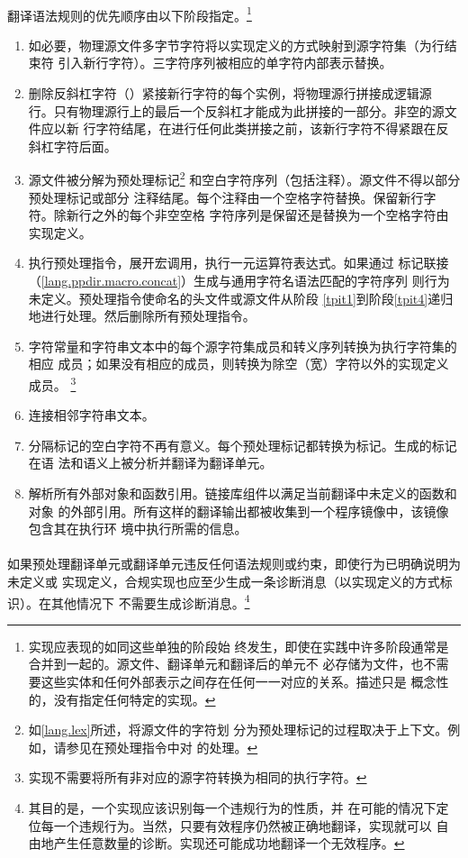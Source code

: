 \paragraph{}
翻译语法规则的优先顺序由以下阶段指定。\footnote{实现应表现的如同这些单独的阶段始
终发生，即使在实践中许多阶段通常是合并到一起的。源文件、翻译单元和翻译后的单元不
必存储为文件，也不需要这些实体和任何外部表示之间存在任何一一对应的关系。描述只是
概念性的，没有指定任何特定的实现。}
\begin{enumerate}
  \newcommand{\tpit}[1]{\item{#1\label{tpit\arabic{enumi}}}}
  \tpit{如必要，物理源文件多字节字符将以实现定义的方式映射到源字符集（为行结束符
    引入新行字符）。三字符序列被相应的单字符内部表示替换。}
  \tpit{删除反斜杠字符（\tm{\bs}）紧接新行字符的每个实例，将物理源行拼接成逻辑源
    行。只有物理源行上的最后一个反斜杠才能成为此拼接的一部分。非空的源文件应以新
    行字符结尾，在进行任何此类拼接之前，该新行字符不得紧跟在反斜杠字符后面。}
  \tpit{源文件被分解为预处理标记\footnote{如\ref{lang.lex}所述，将源文件的字符划
    分为预处理标记的过程取决于上下文。例如，请参见在\tm{\#include}预处理指令中对
    \tm{<}的处理。} 和空白字符序列（包括注释）。源文件不得以部分预处理标记或部分
    注释结尾。每个注释由一个空格字符替换。保留新行字符。除新行之外的每个非空空格
    字符序列是保留还是替换为一个空格字符由实现定义。}
  \tpit{执行预处理指令，展开宏调用，执行一元运算符表达式。如果通过
    标记联接（\ref{lang.ppdir.macro.concat}）生成与通用字符名语法匹配的字符序列
    则行为未定义。\tm{\#include}预处理指令使命名的头文件或源文件从阶段
    \ref{tpit1}到阶段\ref{tpit4}递归地进行处理。然后删除所有预处理指令。}
  \tpit{字符常量和字符串文本中的每个源字符集成员和转义序列转换为执行字符集的相应
    成员；如果没有相应的成员，则转换为除空（宽）字符以外的实现定义成员。
    \footnote{实现不需要将所有非对应的源字符转换为相同的执行字符。}}
  \tpit{连接相邻字符串文本。}
  \tpit{分隔标记的空白字符不再有意义。每个预处理标记都转换为标记。生成的标记在语
    法和语义上被分析并翻译为翻译单元。}
  \tpit{解析所有外部对象和函数引用。链接库组件以满足当前翻译中未定义的函数和对象
    的外部引用。所有这样的翻译输出都被收集到一个程序镜像中，该镜像包含其在执行环
    境中执行所需的信息。}
\end{enumerate}


\paragraph{}
如果预处理翻译单元或翻译单元违反任何语法规则或约束，即使行为已明确说明为未定义或
实现定义，合规实现也应至少生成一条诊断消息（以实现定义的方式标识）。在其他情况下
不需要生成诊断消息。\footnote{其目的是，一个实现应该识别每一个违规行为的性质，并
在可能的情况下定位每一个违规行为。当然，只要有效程序仍然被正确地翻译，实现就可以
自由地产生任意数量的诊断。实现还可能成功地翻译一个无效程序。}

